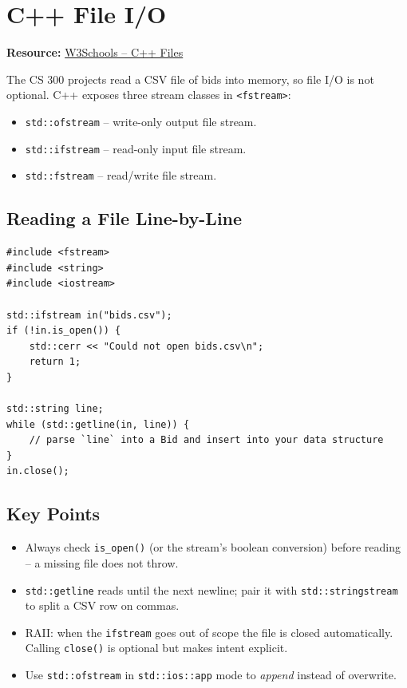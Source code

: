 \documentclass[11pt]{article}
\begin{document}
\section{C++ File I/O}
\textbf{Resource:} \href{https://www.w3schools.com/cpp/cpp_files.asp}{W3Schools -- C++ Files}

The CS 300 projects read a CSV file of bids into memory, so file I/O
is not optional. C++ exposes three stream classes in \texttt{<fstream>}:
\begin{itemize}[leftmargin=*]
    \item \texttt{std::ofstream} -- write-only output file stream.
    \item \texttt{std::ifstream} -- read-only input file stream.
    \item \texttt{std::fstream}  -- read/write file stream.
\end{itemize}

\subsection*{Reading a File Line-by-Line}
\begin{lstlisting}[basicstyle=\ttfamily\small,frame=single]
#include <fstream>
#include <string>
#include <iostream>

std::ifstream in("bids.csv");
if (!in.is_open()) {
    std::cerr << "Could not open bids.csv\n";
    return 1;
}

std::string line;
while (std::getline(in, line)) {
    // parse `line` into a Bid and insert into your data structure
}
in.close();
\end{lstlisting}

\subsection*{Key Points}
\begin{itemize}[leftmargin=*]
    \item Always check \texttt{is\_open()} (or the stream's boolean
          conversion) before reading -- a missing file does not throw.
    \item \texttt{std::getline} reads until the next newline; pair it
          with \texttt{std::stringstream} to split a CSV row on
          commas.
    \item RAII: when the \texttt{ifstream} goes out of scope the file
          is closed automatically. Calling \texttt{close()} is
          optional but makes intent explicit.
    \item Use \texttt{std::ofstream} in \texttt{std::ios::app} mode to
          \emph{append} instead of overwrite.
\end{itemize}
\end{document}
